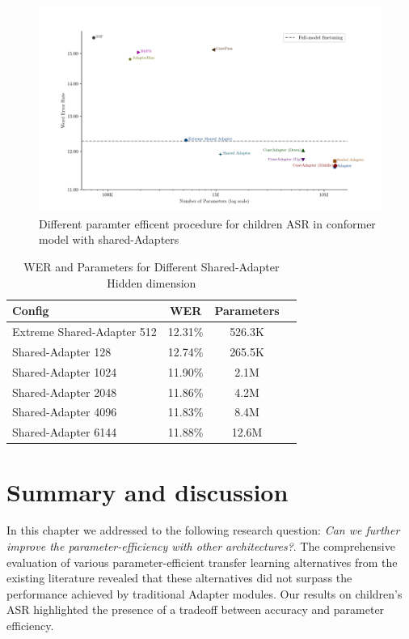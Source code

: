 \begin{figure}
    \begin{center}
        \includegraphics[width=\textwidth]{imgs/Adapters_compare.png}
        \caption{Different paramter efficent procedure for children ASR in conformer model with shared-Adapters}
        \label{fig:adapter_compared}
    \end{center}
\end{figure}
\begin{table}[ht]
    \centering
    \begin{tabular}{l c c c}
        \textbf{Config} & \textbf{WER} & \textbf{Parameters} \\
        \hline
        Extreme Shared-Adapter  512& 12.31\% & 526.3K \\ \hline
        Shared-Adapter 128 & 12.74\% & 265.5K \\
        Shared-Adapter 1024 & 11.90\% & 2.1M \\
        Shared-Adapter 2048 & 11.86\% & 4.2M \\
        Shared-Adapter 4096 & 11.83\% & 8.4M \\
        Shared-Adapter 6144 & 11.88\% & 12.6M \\ \hline
    \end{tabular}
    \caption{WER and Parameters for Different Shared-Adapter Hidden dimension}
    \label{tab:shared_adapter_results}
\end{table}



\section{Summary and discussion}
In this chapter we addressed to the following research question: \textit{Can we further improve the parameter-efficiency with other architectures?}. The comprehensive evaluation of various parameter-efficient transfer learning alternatives from the existing literature revealed that these alternatives did not surpass the performance achieved by traditional Adapter modules. Our results on children's ASR highlighted the presence of a tradeoff between accuracy and parameter efficiency.

